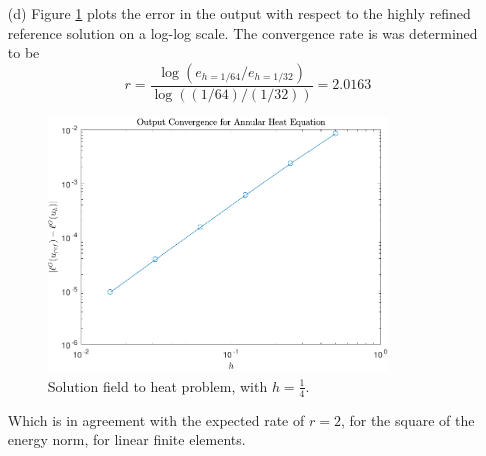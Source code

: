 \documentclass{article}
\begin{document}
\begin{itemize}
	\item[(d)] Figure \ref{conv} plots the error in the output with respect to the highly refined reference solution on a log-log scale. The convergence rate is was determined to be
	\begin{equation}
		r = \dfrac{\log\left(e_{h=1/64}/ e_{h=1/32} \right)}{\log\left((1/64) / (1/32) \right)} = 2.0163
	\end{equation}
	\begin{figure}[t]
		\centering
		\includegraphics[width=0.85\textwidth]{fig1.pdf}
		\caption{Solution field to heat problem, with \(h = \frac{1}{4} \).}
		\label{conv}
	\end{figure}
	Which is in agreement with the expected rate of \(r = 2\), for the square of the energy norm, for linear finite elements.
\end{itemize}
	
\end{document}
